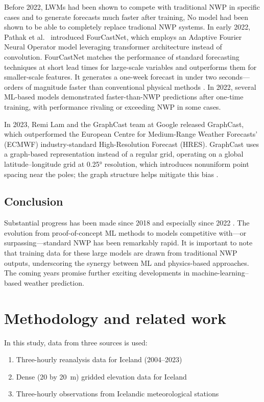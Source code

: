 Before 2022, LWMs had been shown to compete with traditional NWP in specific cases and to generate forecasts much faster after training, No model had been shown to be able to completely replace tradional NWP systems. In early 2022, Pathak et al.\ \cite{FourCastNet} introduced FourCastNet, which employs an Adaptive Fourier Neural Operator model leveraging transformer architecture instead of convolution. FourCastNet matches the performance of standard forecasting techniques at short lead times for large-scale variables and outperforms them for smaller-scale features. It generates a one-week forecast in under two seconds—orders of magnitude faster than conventional physical methods \cite{FourCastNet}. In 2022, several ML-based models demonstrated faster-than-NWP predictions after one-time training, with performance rivaling or exceeding NWP in some cases.

In 2023, Remi Lam and the GraphCast team at Google released GraphCast, which outperformed the European Centre for Medium-Range Weather Forecasts’ (ECMWF) industry-standard High-Resolution Forecast (HRES). GraphCast uses a graph-based representation instead of a regular grid, operating on a global latitude–longitude grid at 0.25° resolution, which introduces nonuniform point spacing near the poles; the graph structure helps mitigate this bias \cite{GraphCast}.

\subsection*{Conclusion}
Substantial progress has been made since 2018 and especially since 2022 \cite{SecondRevolution}. The evolution from proof-of-concept ML methods to models competitive with—or surpassing—standard NWP has been remarkably rapid. It is important to note that training data for these large models are drawn from traditional NWP outputs, underscoring the synergy between ML and physics-based approaches. The coming years promise further exciting developments in machine-learning–based weather prediction.

\section{Methodology and related work}
In this study, data from three sources is used:

\begin{enumerate}[label=\textbf{\arabic*}.,rightmargin=1.5em]
  \item Three-hourly reanalysis data for Iceland (2004–2023)
  \item Dense (20 by 20~m) gridded elevation data for Iceland
  \item Three-hourly observations from Icelandic meteorological stations
\end{enumerate}

